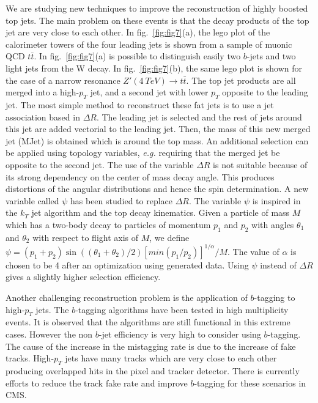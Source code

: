 \documentclass{cimento}
\begin{document}
We are studying new techniques to improve the reconstruction of highly boosted top jets. The 
main problem on these events is that the decay products of the top jet are very close to each other.
In fig.~\ref{fig:fig7}(a), the lego plot of the calorimeter towers of the
four leading jets is shown from a sample of muonic QCD $t\bar{t}$. In fig.~\ref{fig:fig7}(a) is possible to distinguish
easily two $b$-jets and two light jets from the W decay. In fig.~\ref{fig:fig7}(b),
the same lego plot is shown for the case of a narrow resonance $Z'(4~TeV)\rightarrow t\bar{t}$.
The top jet products are all merged into a high-$p_T$ jet, and a second jet with lower $p_T$ opposite to the
leading jet. The most simple method to reconstruct these fat jets is to use a jet 
association based in $\Delta R$. The leading jet is selected and the rest of jets around this
jet are added vectorial to the leading jet. Then, the mass of this new merged jet (MJet) is obtained which is around
the top mass. An additional selection can be applied using topology variables, {\it e.g.} requiring
that the merged jet be opposite to the second jet. The use of the variable $\Delta R$ is not
suitable because of its strong dependency on the center of mass decay angle. This produces
distortions of the angular distributions and hence the spin determination. A new
variable called $\psi$ has been studied to replace $\Delta R$. The variable $\psi$ is inspired in
the $k_T$ jet algorithm and the top decay kinematics. Given a particle of mass $M$ which has a
two-body decay to particles of momentum $p_1$ and $p_2$ with angles $\theta_1$ and $\theta_2$ with
respect to flight axis of $M$, we define $\psi=(p_1+p_2)\sin((\theta_1+\theta_2)/2)[{min}(p_1/p_2)]^{1/\alpha}/M$.
The value of $\alpha$ is chosen to be 4 after an optimization using generated data. Using
$\psi$ instead of $\Delta R$ gives a slightly higher selection efficiency.

Another challenging reconstruction problem is the application of $b$-tagging to high-$p_T$ jets.
The $b$-tagging algorithms have been tested in high multiplicity events. It is observed
that the algorithms are still functional in this extreme cases. However the non $b$-jet efficiency
is very high to consider using $b$-tagging. The cause of the increase in the mistagging rate is due
to the increase of fake tracks. High-$p_T$ jets have many tracks which are very close to each other
producing overlapped hits in the pixel and tracker detector. There is currently efforts to reduce
the track fake rate and improve $b$-tagging for these scenarios in CMS. 
\end{document}
